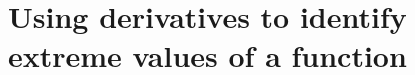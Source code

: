 \section{Using derivatives to identify extreme values of a function} \label{S:3.1.Tests}



\newpage



\newpage



\newpage



\newpage

\clearpage
